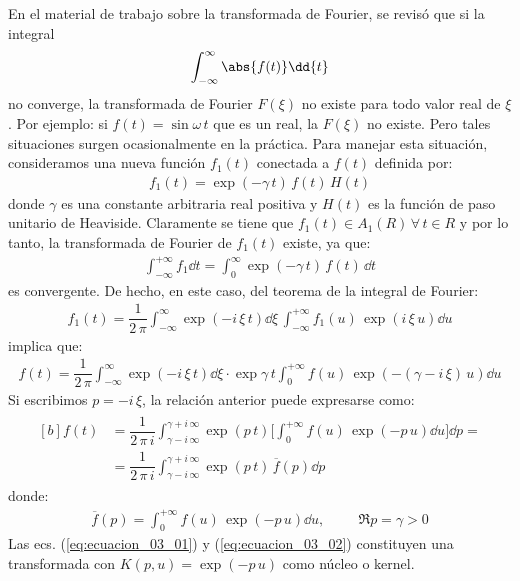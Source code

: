 En el material de trabajo sobre la transformada de Fourier, se revisó que si la integral
\begin{align*}
\int_{-\infty}^{\infty} \abs{f(t)} \dd{t}
\end{align*}
no converge, la transformada de Fourier $F(\xi)$ no existe para todo valor real de $\xi$. Por ejemplo: si $f(t) = \sin \omega \, t$ que es un real, la $F(\xi)$ no existe. Pero tales situaciones surgen ocasionalmente en la práctica. Para manejar esta situación, consideramos una nueva función $f_{1} (t)$ conectada a $f (t)$ definida por:
\begin{align*}
f_{1}(t) =  \exp(- \gamma \, t) \, f(t) \, H(t)
\end{align*}
donde $\gamma$ es una constante arbitraria real positiva y $H(t)$ es la función de paso unitario de Heaviside. Claramente se tiene que $f_{1}(t) \in A_{1}(R) \, \forall \, t \in R$ y por lo tanto, la transformada de Fourier de $f_{1}(t)$ existe, ya que:
\begin{align*}
\int_{-\infty}^{+\infty} f_{1} \dd{t} = \int_{0}^{\infty} \exp(-\gamma \, t) \, f(t) \, \dd{t}
\end{align*}
es convergente. De hecho, en este caso, del teorema de la integral de Fourier:
\begin{align*}
f_{1} (t) = \dfrac{1}{2 \, \pi} \int_{-\infty}^{\infty} \exp(-i \, \xi \, t) \dd{\xi} \, \int_{-\infty}^{+\infty} f_{1}(u) \, \exp(i \, \xi \, u) \dd{u}
\end{align*}
implica que:
\begin{align*}
f (t) = \dfrac{1}{2 \, \pi} \int_{-\infty}^{\infty} \exp(-i \, \xi \, t) \dd{\xi} \cdot \exp{\gamma \, t} \int_{0}^{+\infty} f(u) \, \exp(- (\gamma - i \, \xi) \, u) \dd{u}
\end{align*}
Si escribimos $p = - i \, \xi$, la relación anterior puede expresarse como:
\begin{align}
\begin{aligned}[b]
f (t) &= \dfrac{1}{2 \, \pi \, i} \int_{\gamma -i \, \infty}^{\gamma + i \, \infty} \exp(p \, t) \bigg[ \int_{0}^{+\infty} f(u) \, \exp(- p \, u) \dd{u} \bigg] \dd{p} = \\[0.5em]
&= \dfrac{1}{2 \, \pi \, i} \int_{\gamma -i \, \infty}^{\gamma + i \, \infty} \exp(p \, t) \, \overline{f} (p) \dd{p} 
\end{aligned}
\label{eq:ecuacion_03_01}
\end{align}
donde:
\begin{align}
\overline{f} (p) = \int_{0}^{+\infty} f(u) \, \exp(- p \, u) \dd{u}, \hspace{1cm} \Re{p} = \gamma > 0
\label{eq:ecuacion_03_02}
\end{align}
Las ecs. (\ref{eq:ecuacion_03_01}) y (\ref{eq:ecuacion_03_02}) constituyen una transformada con $K(p, u) = \exp(- p \, u)$ como núcleo o kernel.

